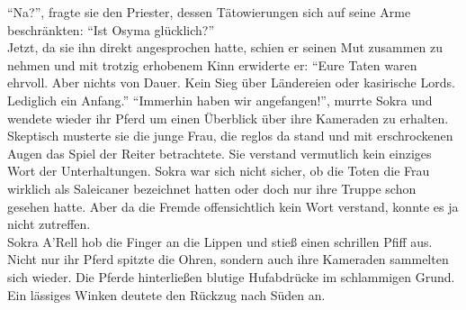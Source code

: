 ``Na?'', fragte sie den Priester, dessen Tätowierungen sich auf seine Arme beschränkten: ``Ist 
Osyma glücklich?''\\
Jetzt, da sie ihn direkt angesprochen hatte, schien er seinen Mut zusammen zu nehmen und mit 
trotzig erhobenem Kinn erwiderte er: ``Eure Taten waren ehrvoll. Aber nichts von Dauer. Kein Sieg 
über Ländereien oder kasirische Lords. Lediglich ein Anfang.''
``Immerhin haben wir angefangen!'', murrte Sokra und wendete wieder ihr Pferd um einen Überblick 
über ihre Kameraden zu erhalten. Skeptisch musterte sie die junge Frau, die reglos da stand und mit 
erschrockenen Augen das Spiel der Reiter betrachtete. Sie verstand vermutlich kein einziges Wort der 
Unterhaltungen. Sokra war sich nicht sicher, ob die Toten die Frau wirklich als Saleicaner 
bezeichnet hatten oder doch nur ihre Truppe schon gesehen hatte. Aber da die Fremde offensichtlich 
kein Wort verstand, konnte es ja nicht zutreffen.\\
Sokra A'Rell hob die Finger an die Lippen und stieß einen schrillen Pfiff aus. Nicht nur ihr 
Pferd spitzte die Ohren, sondern auch ihre Kameraden sammelten sich wieder. Die Pferde hinterließen 
blutige Hufabdrücke im schlammigen Grund. Ein lässiges Winken deutete den Rückzug nach Süden an.\\



